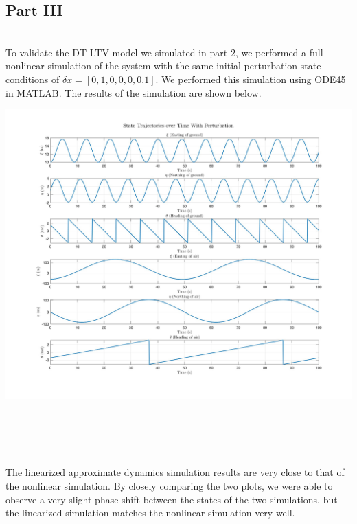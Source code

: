 \documentclass[paper=a4, fontsize=11pt]{scrartcl} %
\numberwithin{equation}{section} %
\numberwithin{figure}{section} %
\numberwithin{table}{section} %
\begin{document}
\begin{framed}
\newpage
\subsection{Part III} \\
To validate the DT LTV model we simulated in part 2, we performed a full nonlinear simulation of the system with the same initial perturbation state conditions of \(\delta x = [0, 1, 0, 0, 0, 0.1]\). We performed this simulation using ODE45 in MATLAB. The results of the simulation are shown below.

\begin{minipage}[t]{1\linewidth}
   \vspace{-2ex}
   \centering
   \includegraphics[scale=0.2]{NonlinearSimStateDynamics.png}
\end{minipage}
\\~\\
\\~\\
The linearized approximate dynamics simulation results are very close to that of the nonlinear simulation. By closely comparing the two plots, we were able to observe a very slight phase shift between the states of the two simulations, but the linearized simulation matches the nonlinear simulation very well.
\end{framed}


\newpage
\end{document}
